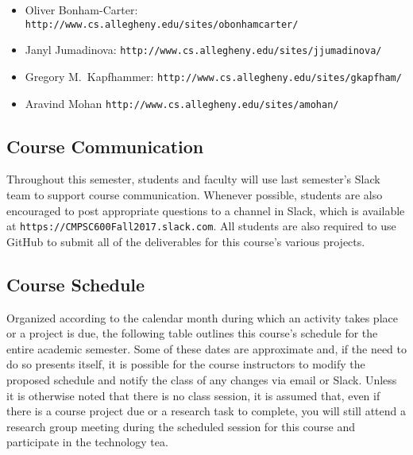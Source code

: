 \documentclass[11pt]{article}
\newcommand{\url}[1]{\lstinline{#1}}
\begin{document}
\vspace*{-.1in}
\begin{itemize}
  \itemsep -.25em
  \item Oliver Bonham-Carter: \url{http://www.cs.allegheny.edu/sites/obonhamcarter/}
  \item Janyl Jumadinova: \url{http://www.cs.allegheny.edu/sites/jjumadinova/}
  \item Gregory M.\ Kapfhammer: \url{http://www.cs.allegheny.edu/sites/gkapfham/}
  \item Aravind Mohan \url{http://www.cs.allegheny.edu/sites/amohan/}
\end{itemize}

\vspace*{-.25in}
\subsection*{Course Communication}

Throughout this semester, students and faculty will use last semester's Slack
team to support course communication. Whenever possible, students are also
encouraged to post appropriate questions to a channel in Slack, which is
available at \url{https://CMPSC600Fall2017.slack.com}. All students are also
required to use GitHub to submit all of the deliverables for this course's
various projects.

\vspace*{-.1in}
\subsection*{Course Schedule}

Organized according to the calendar month during which an activity takes place
or a project is due, the following table outlines this course's schedule for
the entire academic semester. Some of these dates are approximate and, if the
need to do so presents itself, it is possible for the course instructors to
modify the proposed schedule and notify the class of any changes via email or
Slack. Unless it is otherwise noted that there is no class session, it is
assumed that, even if there is a course project due or a research task to
complete, you will still attend a research group meeting during the scheduled
session for this course and participate in the technology tea.
\end{document}
